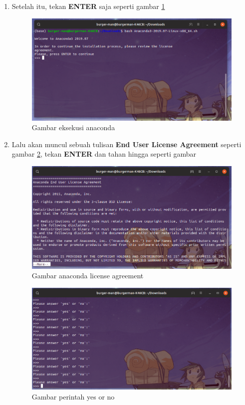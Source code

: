 \begin{enumerate}
\item Setelah itu, tekan \textbf{ENTER} saja seperti gambar \ref{anacondaenter}
\begin{figure}[H]
\centering
\includegraphics[width=1\textwidth]{figures/anacondaenter.png}
\caption{Gambar eksekusi anaconda}
\label{anacondaenter}
\end{figure}

\item Lalu akan muncul sebuah tulisan \textbf{End User License Agreement} seperti gambar \ref{entertrus}, tekan \textbf{ENTER} dan tahan hingga seperti gambar 
\begin{figure}[H]
\centering
\includegraphics[width=1\textwidth]{figures/entertrus.png}
\caption{Gambar anaconda license agreement}
\label{entertrus}
\end{figure}
\begin{figure}[H]
\centering
\includegraphics[width=1\textwidth]{figures/enterkekgini.png}
\caption{Gambar perintah yes or no}
\label{enterkekgini}
\end{figure}


\end{enumerate}
